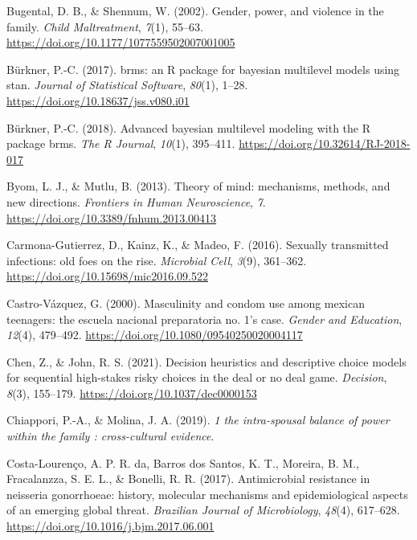 \documentclass[
  donotrepeattitle,doc, 12pt, a4paper,floatsintext]{apa7}
\newlength{\cslhangindent}
\newlength{\cslentryspacingunit} %
\newenvironment{CSLReferences}[2] %
 {%
  \setlength{\parindent}{0pt}
  \ifodd #1
  \let\oldpar\par
  \def\par{\hangindent=\cslhangindent\oldpar}
  \fi
  \setlength{\parskip}{#2\cslentryspacingunit}
 }%
 {}
\begin{document}
\begin{CSLReferences}{1}{0}
\leavevmode{}%
Bugental, D. B., \& Shennum, W. (2002). Gender, power, and violence in the family. \emph{Child Maltreatment}, \emph{7}(1), 55--63. \url{https://doi.org/10.1177/1077559502007001005}

\leavevmode{}%
Bürkner, P.-C. (2017). brms: an R package for bayesian multilevel models using stan. \emph{Journal of Statistical Software}, \emph{80}(1), 1--28. \url{https://doi.org/10.18637/jss.v080.i01}

\leavevmode{}%
Bürkner, P.-C. (2018). Advanced bayesian multilevel modeling with the R package brms. \emph{The R Journal}, \emph{10}(1), 395--411. \url{https://doi.org/10.32614/RJ-2018-017}

\leavevmode{}%
Byom, L. J., \& Mutlu, B. (2013). Theory of mind: mechanisms, methods, and new directions. \emph{Frontiers in Human Neuroscience}, \emph{7}. \url{https://doi.org/10.3389/fnhum.2013.00413}

\leavevmode{}%
Carmona-Gutierrez, D., Kainz, K., \& Madeo, F. (2016). Sexually transmitted infections: old foes on the rise. \emph{Microbial Cell}, \emph{3}(9), 361--362. \url{https://doi.org/10.15698/mic2016.09.522}

\leavevmode{}%
Castro-Vázquez, G. (2000). Masculinity and condom use among mexican teenagers: the escuela nacional preparatoria no. 1's case. \emph{Gender and Education}, \emph{12}(4), 479--492. \url{https://doi.org/10.1080/09540250020004117}

\leavevmode{}%
Chen, Z., \& John, R. S. (2021). Decision heuristics and descriptive choice models for sequential high-stakes risky choices in the deal or no deal game. \emph{Decision}, \emph{8}(3), 155--179. \url{https://doi.org/10.1037/dec0000153}

\leavevmode{}%
Chiappori, P.-A., \& Molina, J. A. (2019). \emph{1 the intra-spousal balance of power within the family : cross-cultural evidence}.

\leavevmode{}%
Costa-Lourenço, A. P. R. da, Barros dos Santos, K. T., Moreira, B. M., Fracalanzza, S. E. L., \& Bonelli, R. R. (2017). Antimicrobial resistance in neisseria gonorrhoeae: history, molecular mechanisms and epidemiological aspects of an emerging global threat. \emph{Brazilian Journal of Microbiology}, \emph{48}(4), 617--628. \url{https://doi.org/10.1016/j.bjm.2017.06.001}


\end{CSLReferences}
\end{document}
